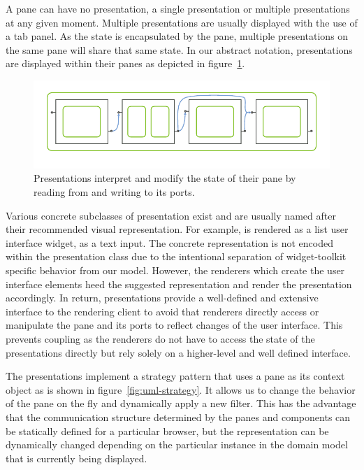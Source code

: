 \documentclass[a4paper,10pt,twoside]{book}
\begin{document}
A pane can have no presentation, a single presentation or multiple presentations at any given moment. Multiple presentations are usually displayed with the use of a tab panel. As the state is encapsulated by the pane, multiple presentations on the same pane will share that same state. In our abstract notation, presentations are displayed within their panes as depicted in figure~\ref{fig:abs-presentations}.

\begin{figure}[htbp]
\centerline{\includegraphics[width=\linewidth]{presentations.pdf}}
\caption{Presentations interpret and modify the state of their pane by reading from and writing to its ports.}
\label{fig:abs-presentations}
\end{figure}

Various concrete subclasses of presentation exist and are usually named after their recommended visual representation. For example,  is rendered as a list user interface widget,  as a text input. The concrete representation is not encoded within the presentation class due to the intentional separation of widget-toolkit specific behavior from our model. However, the renderers which create the user interface elements heed the suggested representation and render the presentation accordingly. In return, presentations provide a well-defined and extensive interface to the rendering client to avoid that renderers directly access or manipulate the pane and its ports to reflect changes of the user interface. This prevents coupling as the renderers do not have to access the state of the presentations directly but rely solely on a higher-level and well defined interface.

The presentations implement a strategy pattern that uses a pane as its
context object as is shown in figure~\ref{fig:uml-strategy}. It allows
us to change the behavior of the pane on the fly and dynamically apply
a new filter. This has the advantage that the communication structure
determined by the panes and components can be statically defined for a
particular browser, but the representation can be dynamically changed
depending on the particular instance in the domain model that is
currently being displayed.
\end{document}
